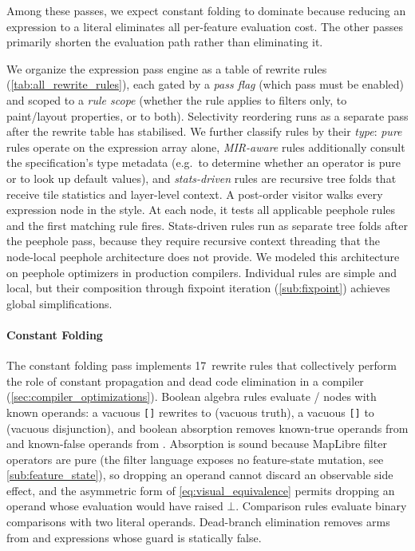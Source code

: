 Among these passes, we expect constant folding to dominate because reducing an expression to a literal eliminates all per-feature evaluation cost.
The other passes primarily shorten the evaluation path rather than eliminating it.

We organize the expression pass engine as a table of rewrite rules (\cref{tab:all_rewrite_rules}), each gated by a \emph{pass flag} (which pass must be enabled) and scoped to a \emph{rule scope} (whether the rule applies to filters only, to paint/layout properties, or to both).
Selectivity reordering runs as a separate pass after the rewrite table has stabilised.
We further classify rules by their \emph{type}:
	\emph{pure} rules operate on the expression array alone,
	\emph{MIR-aware} rules additionally consult the specification's type metadata (e.g.\ to determine whether an operator is pure or to look up default values), and
	\emph{stats-driven} rules are recursive tree folds that receive tile statistics and layer-level context.
A post-order visitor walks every expression node in the style.
At each node, it tests all applicable peephole rules and the first matching rule fires.
Stats-driven rules run as separate tree folds after the peephole pass, because they require recursive context threading that the node-local peephole architecture does not provide.
We modeled this architecture on peephole optimizers in production compilers.
Individual rules are simple and local, but their composition through fixpoint iteration (\cref{sub:fixpoint}) achieves global simplifications.

\paragraph{Constant Folding}
The constant folding pass implements 17~rewrite rules that collectively perform the role of constant propagation and dead code elimination in a compiler (\cref{sec:compiler_optimizations}).
Boolean algebra rules evaluate /  nodes with known operands: a vacuous \texttt{[]} rewrites to  (vacuous truth), a vacuous \texttt{[]} to  (vacuous disjunction), and boolean absorption removes known-true operands from  and known-false operands from .
Absorption is sound because MapLibre filter operators are pure (the filter language exposes no feature-state mutation, see \cref{sub:feature_state}), so dropping an operand cannot discard an observable side effect, and the asymmetric form of \cref{eq:visual_equivalence} permits dropping an operand whose evaluation would have raised $\bot$.
Comparison rules evaluate binary comparisons with two literal operands.
Dead-branch elimination removes arms from  and  expressions whose guard is statically false.

